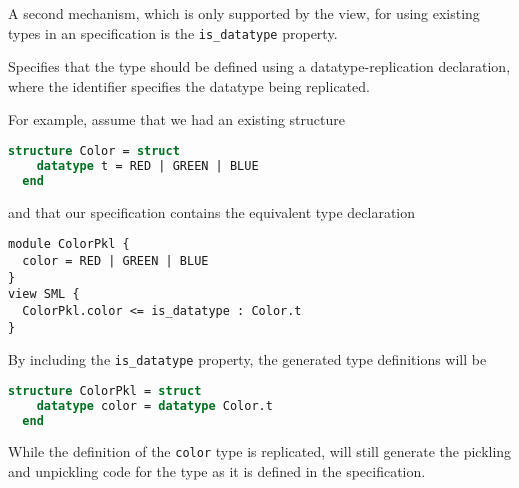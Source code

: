 A second mechanism, which is only supported by the \sml{} view, for using existing types
in an \asdl{} specification is the \lstinline!is_datatype! property.
\begin{description}
    Specifies that the \asdl{} type should be defined using
    a datatype-replication declaration, where the identifier
    specifies the datatype being replicated.
\end{description}
For example, assume that we had an existing structure
%
\begin{code}\begin{lstlisting}[language=SML]
structure Color = struct
    datatype t = RED | GREEN | BLUE
  end
\end{lstlisting}\end{code}%
%
and that our \asdl{} specification contains the equivalent type declaration
%
\begin{code}\begin{lstlisting}[language=ASDL]
module ColorPkl {
  color = RED | GREEN | BLUE
}
view SML {
  ColorPkl.color <= is_datatype : Color.t
}
\end{lstlisting}\end{code}%
By including the \lstinline!is_datatype! property, the generated type
definitions will be
%
\begin{code}\begin{lstlisting}[language=SML]
structure ColorPkl = struct
    datatype color = datatype Color.t
  end
\end{lstlisting}\end{code}%
%
While the definition of the \lstinline!color! type is replicated, \asdlgen{} will still
generate the pickling and unpickling code for the type as it is defined in the \asdl{}
specification.

